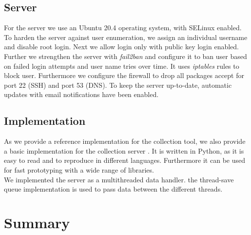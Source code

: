     \subsection{Server}
        \label{subsec:measure:server}
        For the server we use an Ubuntu 20.4 operating system, with SELinux enabled.
        To harden the server against user enumeration, we assign an individual username and disable root login. Next we allow login only with public key login enabled.
        Further we strengthen the server with \textit{fail2ban} and configure it to ban user based on failed login attempts and user name tries over time. It uses \textit{iptables} rules to block user. Furthermore we configure the firewall to drop all packages accept for port 22 (SSH) and port 53 (DNS). To keep the server up-to-date, automatic updates with email notifications have been enabled.
        
    \subsection{Implementation}
        \label{subsec:measure:implementation}
        As we provide a reference implementation for the collection tool, we also provide a basic implementation for the collection server \cite{venz_ikstreamdns-handler_2021}. It is written in Python, as it is easy to read and to reproduce in different languages. Furthermore it can be used for fast prototyping with a wide range of libraries.\\
        We implemented the server as a multithreaded data handler. the thread-save queue implementation is used to pass data between the different threads.



%
\newpage
%
 

\section{Summary}


%
